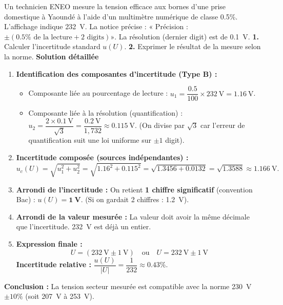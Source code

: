 \documentclass[11pt]{article}
\begin{document}
\begin{exoresolu}
    Un technicien ENEO mesure la tension efficace aux bornes d'une prise domestique à Yaoundé à l'aide d'un multimètre numérique de classe \num{0,5}\%. L'affichage indique \SI{232}{\volt}. La notice précise : « Précision : $\pm(\num{0,5}\% \text{ de la lecture} + 2 \text{ digits}) »$. La résolution (dernier digit) est de \SI{0,1}{\volt}.
    \textbf{1.} Calculer l'incertitude standard $u(U)$.
    \textbf{2.} Exprimer le résultat de la mesure selon la norme.
    \tcblower
    \textbf{Solution détaillée}
    \begin{enumerate}
        \item \textbf{Identification des composantes d'incertitude (Type B) :}
              \begin{itemize}
                  \item Composante liée au pourcentage de lecture : $u_1 = \dfrac{\num{0,5}}{100} \times \SI{232}{\volt} = \SI{1,16}{\volt}$.
                  \item Composante liée à la résolution (quantification) : $u_2 = \dfrac{2 \times \SI{0,1}{\volt}}{\sqrt{3}} = \dfrac{\SI{0,2}{\volt}}{1,732} \approx \SI{0,115}{\volt}$.
                        (On divise par $\sqrt{3}$ car l'erreur de quantification suit une loi uniforme sur $\pm 1$ digit).
              \end{itemize}
        \item \textbf{Incertitude composée (sources indépendantes) :}
              \[ u_c(U) = \sqrt{u_1^2 + u_2^2} = \sqrt{\num{1,16}^2 + \num{0,115}^2} = \sqrt{\num{1,3456} + \num{0,0132}} = \sqrt{\num{1,3588}} \approx \SI{1,166}{\volt}. \]
        \item \textbf{Arrondi de l'incertitude :} On retient \textbf{1 chiffre significatif} (convention Bac) : $u(U) = \mathbf{\SI{1}{\volt}}$.
              (Si on gardait 2 chiffres : \SI{1,2}{\volt}).
        \item \textbf{Arrondi de la valeur mesurée :} La valeur doit avoir la même décimale que l'incertitude. \SI{232}{\volt} est déjà un entier.
        \item \textbf{Expression finale :}
              \[ \boxed{U = (\SI{232}{\volt} \pm \SI{1}{\volt})} \quad \text{ou} \quad \boxed{U = \SI{232}{\volt} \pm \SI{1}{\volt}} \]
              \textbf{Incertitude relative :} $\dfrac{u(U)}{|U|} = \dfrac{1}{232} \approx \num{0,43}\%$.
    \end{enumerate}
    \textbf{Conclusion :} La tension secteur mesurée est compatible avec la norme \SI{230}{\volt} $\pm \num{10}\%$ (soit \SI{207}{\volt} à \SI{253}{\volt}).
\end{exoresolu}
\end{document}
